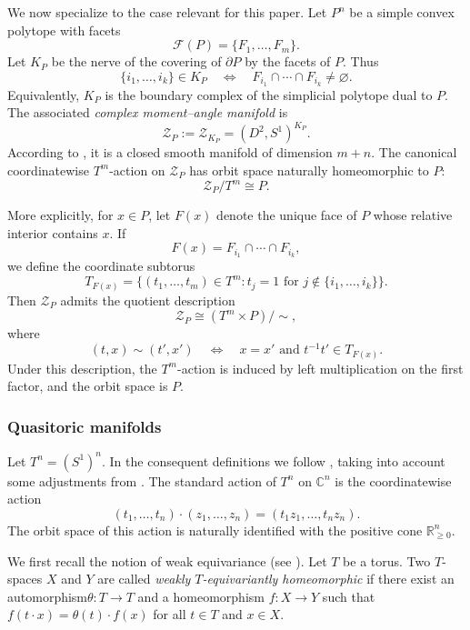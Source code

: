 \documentclass[11pt,a4paper]{article}
\numberwithin{equation}{section}
\theoremstyle{named}
\begin{document}
We now specialize to the case relevant for this paper. Let \(P^n\) be a simple convex polytope with facets
\[
    \mathcal F(P)=\{F_1,\ldots,F_m\}.
\]
Let \(K_P\) be the nerve of the covering of \(\partial P\) by the facets of \(P\). Thus
\[
    \{i_1,\ldots,i_k\}\in K_P
    \quad\Longleftrightarrow\quad
    F_{i_1}\cap\cdots\cap F_{i_k}\neq\varnothing .
\]
Equivalently, \(K_P\) is the boundary complex of the simplicial polytope dual to \(P\). The associated \emph{complex moment--angle manifold} is
\[
    \mathcal Z_P:=\mathcal Z_{K_P}=(D^2,S^1)^{K_P}.
\]
According to \cite[Theorem 4.1.4]{tt}, it is a closed smooth manifold of dimension \(m+n\). The canonical coordinatewise \(T^m\)-action on \(\mathcal Z_P\) has orbit space naturally homeomorphic to \(P\):
\[
    \mathcal Z_P/T^m\cong P.
\]

More explicitly, for \(x\in P\), let \(F(x)\) denote the unique face of \(P\) whose relative interior contains \(x\). If
\[
    F(x)=F_{i_1}\cap\cdots\cap F_{i_k},
\]
we define the coordinate subtorus
\[
    T_{F(x)}
    =
    \{(t_1,\ldots,t_m)\in T^m:
    t_j=1 \text{ for } j\notin \{i_1,\ldots,i_k\}\}.
\]
Then \(\mathcal Z_P\) admits the quotient description
\[
    \mathcal Z_P\cong (T^m\times P)/{\sim},
\]
where
\[
    (t,x)\sim(t',x')
    \quad\Longleftrightarrow\quad
    x=x'
    \text{ and }
    t^{-1}t'\in T_{F(x)}.
\]
Under this description, the \(T^m\)-action is induced by left multiplication on the first factor, and the orbit space is \(P\).

\subsubsection{Quasitoric manifolds}
\label{sec:quasitoric_manifolds}

Let \(T^n=(S^1)^n\). In the consequent definitions we follow \cite{dj}, taking into account some adjustments from \cite{tt}. The standard action of \(T^n\) on \(\mathbb C^n\) is the coordinatewise action
\[
    (t_1,\ldots,t_n)\cdot (z_1,\ldots,z_n)
    =
    (t_1z_1,\ldots,t_nz_n).
\]
The orbit space of this action is naturally identified with the positive cone \(\mathbb R_{\ge 0}^{n}\).

We first recall the notion of weak equivariance (see \cite{weimeler12}). Let \(T\) be a torus. Two \(T\)-spaces \(X\) and \(Y\) are called \emph{weakly \(T\)-equivariantly homeomorphic} if there exist an automorphism\(\theta:T\longrightarrow T\) and a homeomorphism \(f:X\longrightarrow Y\) such that \(f(t\cdot x)=\theta(t)\cdot f(x)\) for all \(t\in T\) and \(x\in X\).
\end{document}
